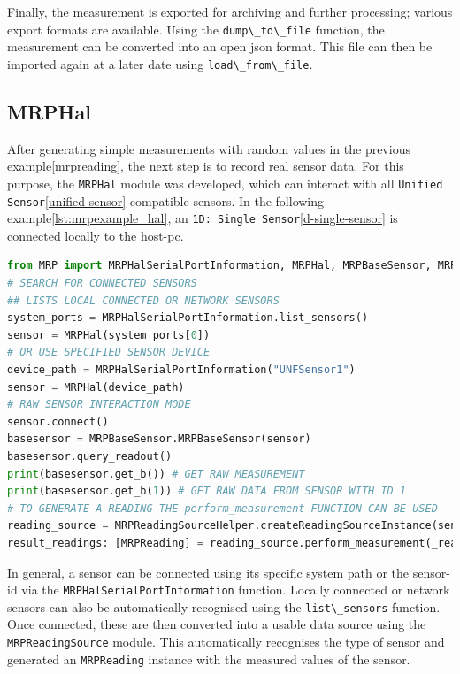 Finally, the measurement is exported for archiving and further
processing; various export formats are available. Using the
\passthrough{\lstinline!dump\_to\_file!} function, the measurement can
be converted into an open \gls{json} format. This file can then be
imported again at a later date using
\passthrough{\lstinline!load\_from\_file!}.

\hypertarget{mrphal}{%
\subsection{MRPHal}\label{mrphal}}

After generating simple measurements with random values in the previous
example\ref{mrpreading}, the next step is to record real sensor data.
For this purpose, the \passthrough{\lstinline!MRPHal!} module was
developed, which can interact with all
\passthrough{\lstinline!Unified Sensor!}\ref{unified-sensor}-compatible
sensors. In the following example\ref{lst:mrpexample_hal}, an
\passthrough{\lstinline!1D: Single Sensor!}\ref{d-single-sensor} is
connected locally to the host-\gls{pc}.

\begin{lstlisting}[language=Python, caption={MRPHal example to use an connected hardware sensor to store readings inside of an measurement}, label=lst:mrpexample_hal]
from MRP import MRPHalSerialPortInformation, MRPHal, MRPBaseSensor, MRPReadingSource
# SEARCH FOR CONNECTED SENSORS
## LISTS LOCAL CONNECTED OR NETWORK SENSORS
system_ports = MRPHalSerialPortInformation.list_sensors()
sensor = MRPHal(system_ports[0])
# OR USE SPECIFIED SENSOR DEVICE
device_path = MRPHalSerialPortInformation("UNFSensor1")
sensor = MRPHal(device_path)
# RAW SENSOR INTERACTION MODE
sensor.connect()
basesensor = MRPBaseSensor.MRPBaseSensor(sensor)
basesensor.query_readout()
print(basesensor.get_b()) # GET RAW MEASUREMENT
print(basesensor.get_b(1)) # GET RAW DATA FROM SENSOR WITH ID 1
# TO GENERATE A READING THE perform_measurement FUNCTION CAN BE USED
reading_source = MRPReadingSourceHelper.createReadingSourceInstance(sensor)
result_readings: [MRPReading] = reading_source.perform_measurement(_readings=1, _hwavg=1)
\end{lstlisting}

In general, a sensor can be connected using its specific system path or
the sensor-\gls{id} via the
\passthrough{\lstinline!MRPHalSerialPortInformation!} function. Locally
connected or network sensors can also be automatically recognised using
the \passthrough{\lstinline!list\_sensors!} function. Once connected,
these are then converted into a usable data source using the
\passthrough{\lstinline!MRPReadingSource!} module. This automatically
recognises the type of sensor and generated an
\passthrough{\lstinline!MRPReading!} instance with the measured values
of the sensor.

